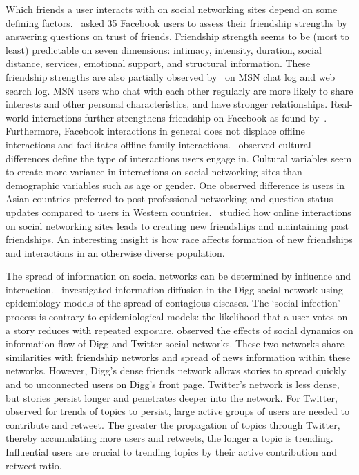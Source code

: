\documentclass[letterpaper]{article}
\begin{document}
Which friends a user interacts with on social networking sites depend on some defining factors.~\cite{gilbert2009predicting} asked 35 Facebook users to assess their friendship strengths by answering questions on trust of friends. Friendship strength seems to be (most to least) predictable on seven dimensions: intimacy, intensity, duration, social distance, services, emotional support, and structural information. These friendship strengths are also partially observed by~\cite{singla2008yes} on MSN chat log and web search log. MSN users who chat with each other regularly are more likely to share interests and other personal characteristics, and have stronger relationships. Real-world interactions further strengthens friendship on Facebook as found by~\cite{brandtzag2011facebook}. Furthermore, Facebook interactions in general does not displace offline interactions and facilitates offline family interactions.~\cite{yang2011culture} observed cultural differences define the type of interactions users engage in. Cultural variables seem to create more variance in interactions on social networking sites than demographic variables such as age or gender. One observed difference is users in Asian countries preferred to post professional networking and question status updates compared to users in Western countries.~\cite{tufekci2010who} studied how online interactions on social networking sites leads to creating new friendships and maintaining past friendships. An interesting insight is how race affects formation of new friendships and interactions in an otherwise diverse population.


The spread of information on social networks can be determined by influence and interaction.~\cite{ver2011stops} investigated information diffusion in the Digg social network using epidemiology models of the spread of contagious diseases. The `social infection’ process is contrary to epidemiological models: the likelihood that a user votes on a story reduces with repeated exposure.\cite{lerman2010information} observed the effects of social dynamics on information flow of Digg and Twitter social networks. These two networks share similarities with friendship networks and spread of news information within these networks. However, Digg’s dense friends network allows stories to spread quickly and to unconnected users on Digg’s front page. Twitter’s network is less dense, but stories persist longer and penetrates deeper into the network. For Twitter,~\cite{asur2011trends} observed for trends of topics to persist, large active groups of users are needed to contribute and retweet. The greater the propagation of topics through Twitter, thereby accumulating more users and retweets, the longer a topic is trending. Influential users are crucial to trending topics by their active contribution and retweet-ratio.
\end{document}

